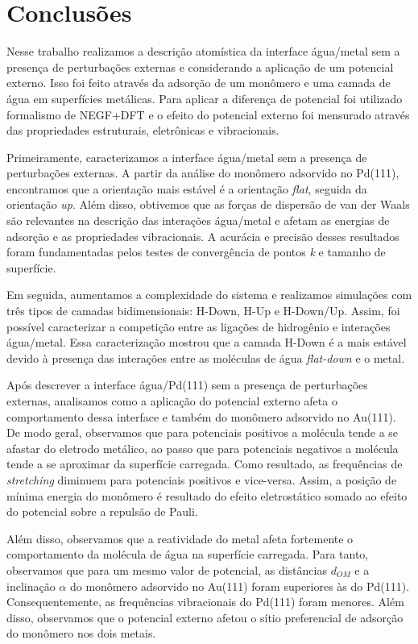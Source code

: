 \chapter[Conclusões]{Conclusões \label{cap:conclusao}}

Nesse trabalho realizamos a descrição atomística da interface água/metal sem a presença de perturbações externas e considerando a aplicação de um potencial externo. Isso foi feito através da adsorção de um monômero e uma camada de água em superfícies metálicas. Para aplicar a diferença de potencial foi utilizado formalismo de NEGF+DFT e o efeito do potencial externo foi mensurado através das propriedades estruturais, eletrônicas e vibracionais. 

Primeiramente, caracterizamos a interface água/metal sem a presença de perturbações externas. A partir da análise do monômero adsorvido no Pd(111), encontramos que a orientação mais estável é a orientação \textit{flat}, seguida da orientação \textit{up}. Além disso, obtivemos que as forças de dispersão de van der Waals são relevantes na descrição das interações água/metal e afetam as energias de adsorção e as propriedades vibracionais. A acurácia e precisão desses resultados foram fundamentadas pelos testes de convergência de pontos \textit{k} e tamanho de superfície.

Em seguida, aumentamos a complexidade do sistema e realizamos simulações com três tipos de camadas bidimensionais: H-Down, H-Up e H-Down/Up. Assim, foi possível caracterizar a competição entre as ligações de hidrogênio e interações água/metal. Essa caracterização mostrou que a camada H-Down é a mais estável devido à presença das interações entre as moléculas de água \textit{flat-down} e o metal.

Após descrever a interface água/Pd(111) sem a presença de perturbações externas, analisamos como a aplicação do potencial externo afeta o comportamento dessa interface e também do monômero adsorvido no Au(111). De modo geral, observamos que para potenciais positivos a molécula tende a se afastar do eletrodo metálico, ao passo que para potenciais negativos a molécula tende a se aproximar da superfície carregada. Como resultado, as frequências de \textit{stretching} diminuem para potenciais positivos e vice-versa. Assim, a posição de mínima energia do monômero é resultado do efeito eletrostático somado ao efeito do potencial sobre a repulsão de Pauli. 

Além disso, observamos que a reatividade do metal afeta fortemente o comportamento da molécula de água na superfície carregada. Para tanto, observamos que para um mesmo valor de potencial, as distâncias $ d_{OM} $ e a inclinação $ \alpha $ do monômero adsorvido no Au(111) foram superiores às do Pd(111). Consequentemente, as frequências vibracionais do Pd(111) foram menores. Além disso, observamos que o potencial externo afetou o sítio preferencial de adsorção do monômero nos dois metais.

